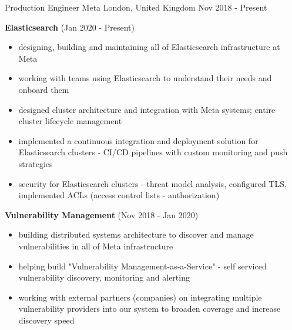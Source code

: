 
\begin{cventries}

  \cventry
    {Production Engineer} %
    {Meta} %
    {London, United Kingdom} %
    {Nov 2018 - Present} %
    {
      \begin{cvitems} %
        \item {
          \textbf{Elasticsearch} (Jan 2020 - Present)
          \begin{itemize}
            \item {designing, building and maintaining all of Elasticsearch infrastructure at Meta}
            \item {working with teams using Elasticsearch to understand their needs and onboard them}
            \item {designed cluster architecture and integration with Meta systems; entire cluster lifecycle management}
            \item {implemented a continuous integration and deployment solution for Elasticsearch clusters - CI/CD pipelines with custom monitoring and push strategies}
            \item {security for Elasticsearch clusters - threat model analysis, configured TLS, implemented ACLs (access control lists - authorization)}
          \end{itemize}
        }
        \item {
          \textbf{Vulnerability Management} (Nov 2018 - Jan 2020)
          \begin{itemize}
            \item {building distributed systems architecture to discover and manage vulnerabilities in all of Meta infrastructure}
            \item {helping build "Vulnerability Management-as-a-Service" - self serviced vulnerability discovery, monitoring and alerting}
            \item {working with external partners (companies) on integrating multiple vulnerability providers into our system to broaden coverage and increase discovery speed}

\end{itemize}}
\end{cvitems}}
\end{cventries}
